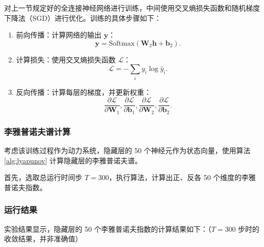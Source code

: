 对上一节规定好的全连接神经网络进行训练，中间使用交叉熵损失函数和随机梯度下降法（SGD）进行优化。训练的具体步骤如下：

\begin{enumerate}
  \item 前向传播：计算网络的输出 \(\mathbf{y}\)：
        \begin{equation}
          \mathbf{y} = \text{Softmax}(\mathbf{W}_2 \mathbf{h} + \mathbf{b}_2).
        \end{equation}
  \item 计算损失：使用交叉熵损失函数 \(\mathcal{L}\)：
        \begin{equation}
          \mathcal{L} = -\sum_{i} y_i \log \hat{y}_i.
        \end{equation}
  \item 反向传播：计算每层的梯度，并更新权重：
        \begin{equation}
          \frac{\partial \mathcal{L}}{\partial \mathbf{W}_1}, \frac{\partial \mathcal{L}}{\partial \mathbf{b}_1}, \frac{\partial \mathcal{L}}{\partial \mathbf{W}_2}, \frac{\partial \mathcal{L}}{\partial \mathbf{b}_2}.
        \end{equation}
\end{enumerate}

\subsubsection{李雅普诺夫谱计算}

考虑该训练过程作为动力系统，隐藏层的 50 个神经元作为状态向量，使用算法 \ref{alg:lyapunov} 计算隐藏层的李雅普诺夫谱。

首先，选取总运行时间步 $T = 300$，执行算法，计算出正、反各 50 个维度的李雅普诺夫指数。

\subsubsection{运行结果}

实验结果显示，隐藏层的 50 个李雅普诺夫指数的计算结果如下：（$T = 300$ 步时的收敛结果，并非准确值）


